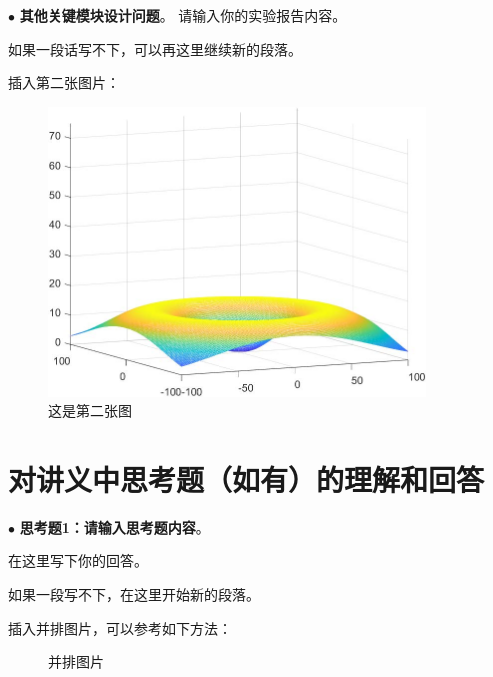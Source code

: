 \documentclass[11pt]{article}
\begin{document}
\vspace{1ex}

\noindent
$\bullet$
\textbf{其他关键模块设计问题}。
请输入你的实验报告内容。

如果一段话写不下，可以再这里继续新的段落。

插入第二张图片：
\begin{figure}[h]
  \centering
  \includegraphics[width=10cm]{fig/Maxwell.pdf}
  \caption{这是第二张图}
\end{figure}

\section{对讲义中思考题（如有）的理解和回答}

\noindent
$\bullet$
\textbf{思考题1：请输入思考题内容}。

在这里写下你的回答。

如果一段写不下，在这里开始新的段落。

插入并排图片，可以参考如下方法：
\begin{figure}[H]
  \centering
  \hspace{0.5in}
  \hspace{0.5in}
  \caption{并排图片}
\end{figure}
\end{document}
